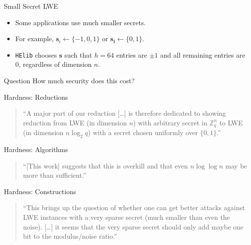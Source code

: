 \documentclass[10pt,compress]{beamer}
\renewcommand{\vec}[1]{\mathbf{#1}\xspace}
\renewcommand{\vec}[1]{\mathbf{#1}\xspace}
\newcommand{\Z}{\ensuremath{\mathbb{Z}}\xspace}
\begin{document}
\begin{frame}{Small Secret LWE}
  \begin{itemize}
  \item Some applications use much smaller secrets.
  \item For example, $\vec{s}_{i} \leftarrow \{-1,0,1\}$ or $\vec{s_{i}} \leftarrow \{0,1\}$.
  \item {\tt HElib} chooses $\vec{s}$ such that $h=64$ entries are $\pm 1$ and all remaining entries are $0$, regardless of dimension $n$.
  \end{itemize}

  \begin{block}{Question}
    How much security does this cost?
  \end{block}

\end{frame}


\begin{frame}{Hardness: Reductions}
  \begin{quote}
    ``A major part of our reduction [\dots] is therefore dedicated to showing  reduction from LWE (in dimension $n$) with arbitrary secret in $\Z_q^n$ to LWE (in dimension $n \log_2 q$) with a secret chosen uniformly over $\{0, 1\}$.''~
  \end{quote}
\end{frame}

\begin{frame}{Hardness: Algorithms}
  \begin{quote}
    ``[This work] suggests that this is overkill and that even $n\log\log n$ may be more than sufficient.''~
  \end{quote}

\end{frame}

\begin{frame}{Hardness: Constructions}

  \begin{quote}
    ``This brings up the question of whether one can get better attacks against LWE instances with a very sparse secret (much smaller than even the noise). [\dots] it seems that the very sparse secret should only add maybe one bit to the modulus/noise ratio.''~
  \end{quote}

\end{frame}
\end{document}
